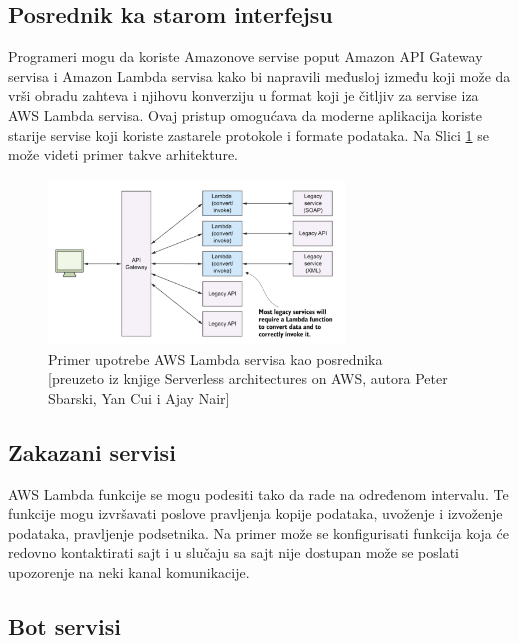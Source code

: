 \documentclass[12pt,oneside]{memoir}
\begin{document}
\subsection{Posrednik ka starom interfejsu} %

Programeri mogu da koriste Amazonove servise poput Amazon API Gateway servisa i Amazon Lambda servisa kako bi napravili međusloj između koji može da vrši obradu zahteva i njihovu konverziju u format koji je čitljiv za servise iza AWS Lambda servisa. Ovaj pristup omogućava da moderne aplikacija koriste starije servise koji koriste zastarele protokole i formate podataka. Na Slici \ref{fig:KonverzijaPodataka} se može videti primer takve arhitekture.

\begin{figure}[!ht]
  \centering
  \includegraphics[width=0.7\textwidth]{Slika 9.png}
  \caption{Primer upotrebe AWS Lambda servisa kao posrednika\\\footnotesize[preuzeto iz knjige Serverless architectures on AWS, autora Peter Sbarski, Yan Cui i Ajay Nair]}
  \label{fig:KonverzijaPodataka}
\end{figure}

\subsection{Zakazani servisi}

AWS Lambda funkcije se mogu podesiti tako da rade na određenom intervalu. Te funkcije mogu izvršavati poslove pravljenja kopije podataka, uvoženje i izvoženje podataka, pravljenje podsetnika. Na primer može se konfigurisati funkcija koja će redovno kontaktirati sajt i u slučaju sa sajt nije dostupan može se poslati upozorenje na neki kanal komunikacije.

\subsection{Bot servisi}
\end{document}
